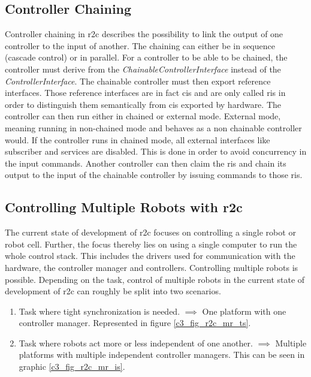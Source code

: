 \subsection{Controller Chaining}
Controller chaining in \gls{r2c} describes the possibility to link the output of one controller to the input of another. The chaining can either be in sequence (cascade control) or in parallel.\newline
For a controller to be able to be chained, the controller must derive from the \textit{ChainableControllerInterface} instead of the \textit{ControllerInterface}. The chainable controller must then export reference interfaces. Those reference interfaces are in fact \glspl{ci} and are only called \glspl{ri} in order to distinguish them semantically from \glspl{ci} exported by hardware. The controller can then run either in chained or external mode. External mode, meaning running in non-chained mode and behaves as a non chainable controller would. If the controller runs in chained mode, all external interfaces like subscriber and services are disabled. This is done in order to avoid concurrency in the input commands. Another controller can then claim the \glspl{ri} and chain its output to the input of the chainable controller by issuing commands to those \glspl{ri}.

\subsection{Controlling Multiple Robots with \gls{r2c}}\label{c3_sec_controlling_multiple_robots}
The current state of development of \gls{r2c} focuses on controlling a single robot or robot cell. Further, the focus thereby lies on using a single computer to run the whole control stack. This includes the drivers used for communication with the hardware, the controller manager and controllers.\newline
Controlling multiple robots is possible. Depending on the task, control of multiple robots in the current state of development of \gls{r2c} can roughly be split into two scenarios.
\begin{enumerate}[start=1,label={\upshape \texttt{Scenario \arabic*:}}, wide = 0pt, leftmargin = 3em]
    \item Task where tight synchronization is needed. $\implies$ One platform with one controller manager. Represented in figure \ref{c3_fig_r2c_mr_ts}.
    \item Task where robots act more or less independent of one another. $\implies$ Multiple platforms with multiple independent controller managers. This can be seen in graphic \ref{c3_fig_r2c_mr_is}.
\end{enumerate}

